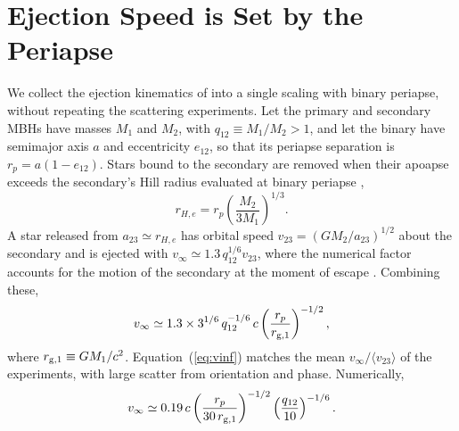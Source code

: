 \documentclass[twocolumn]{aastex701}
\newcommand{\vinf}{v_{\infty}}
\newcommand{\rg}{r_{{\rm g},1}}
\begin{document}
\section{Ejection Speed is Set by the Periapse}
\label{sec:speed}

We collect the ejection kinematics of  into a single
scaling with binary periapse, without repeating the scattering experiments.
Let the primary and secondary MBHs have masses $M_{1}$ and $M_{2}$, with
$q_{12}\equiv M_{1}/M_{2}>1$, and let the binary have semimajor axis $a$ and
eccentricity $e_{12}$, so that its periapse separation is
$r_{p}=a(1-e_{12})$. Stars bound to the secondary are removed when their
apoapse exceeds the secondary's Hill radius evaluated at binary periapse
,
\begin{equation}
r_{H,e} = r_{p}\left(\frac{M_{2}}{3M_{1}}\right)^{1/3}.
\label{eq:hill}
\end{equation}
A star released from $a_{23}\simeq r_{H,e}$ has orbital speed
$v_{23}=(GM_{2}/a_{23})^{1/2}$ about the secondary and is ejected with
$\vinf \simeq 1.3\,q_{12}^{1/6}v_{23}$, where the numerical factor accounts for
the motion of the secondary at the moment of escape \citep{sari10}. Combining
these,
\begin{equation}
\vinf \simeq 1.3\times3^{1/6}\,q_{12}^{-1/6}\,
c\left(\frac{r_{p}}{\rg}\right)^{-1/2},
\label{eq:vinf}
\end{equation}
where $\rg\equiv GM_{1}/c^{2}$. Equation~(\ref{eq:vinf}) matches the mean
$\vinf/\langle v_{23}\rangle$ of the  experiments, with large
scatter from orientation and phase. Numerically,
\begin{equation}
\vinf \simeq 0.19\,c
\left(\frac{r_{p}}{30\,\rg}\right)^{-1/2}
\left(\frac{q_{12}}{10}\right)^{-1/6}.
\label{eq:vinfnum}
\end{equation}
\end{document}
